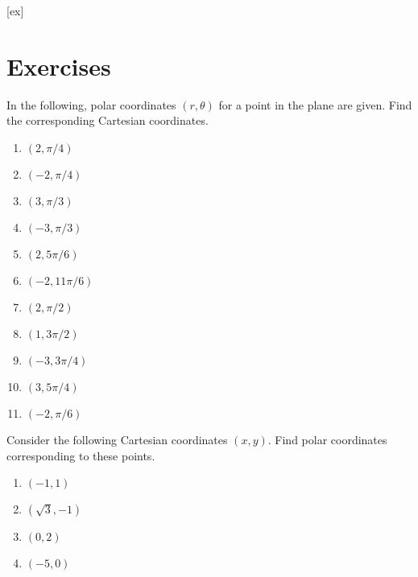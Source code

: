 [ex]
\section*{Exercises}

\begin{enumialphparenastyle}

\begin{ex} In the following, polar coordinates $(r,\theta) $ for a
point in the plane are given. Find the corresponding Cartesian coordinates. 

\begin{enumerate}
\item $(2,\pi /4) $

\item $(-2,\pi /4) $

\item $(3,\pi /3) $

\item $(-3,\pi /3) $

\item $(2,5\pi /6) $

\item $(-2,11\pi /6) $

\item $(2,\pi /2) $

\item $(1,3\pi /2) $

\item $(-3,3\pi /4) $

\item $(3,5\pi /4) $

\item $(-2,\pi /6) $
\end{enumerate}
\end{ex}

\begin{ex} Consider the following Cartesian coordinates $(x,y)$. Find polar coordinates corresponding to these points. 

\begin{enumerate}
\item $(-1,1) $

\item $(\sqrt{3},-1) $

\item $(0,2) $

\item $(-5,0) $


\end{enumerate}
\end{ex}
\end{enumialphparenastyle}
